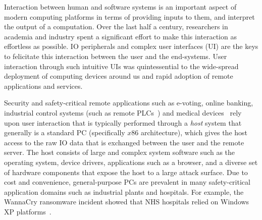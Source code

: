 Interaction between human and software systems is an important aspect of modern computing platforms in terms of providing inputs to them, and interpret the output of a computation. Over the last half a century, researchers in academia and industry spent a significant effort to make this interaction as effortless as possible. IO peripherals and complex user interfaces (UI) are the keys to felicitate this interaction between the user and the end-systems. User interaction through such intuitive UIs was quintessential to the wide-spread deployment of computing devices around us and rapid adoption of remote applications and services. 

Security and safety-critical remote applications such as e-voting, online banking, industrial control systems (such as remote PLCs~\cite{controlbyweb}) and medical devices~\cite{medicalDevice} rely upon user interaction that is typically performed through a \emph{host} system that generally is a standard PC (specifically $x86$ architecture), which gives the host access to the raw IO data that is exchanged between the user and the remote server. The host consists of large and complex system software such as the operating system, device drivers, applications such as a browser, and a diverse set of hardware components that expose the host to a large attack surface. Due to cost and convenience, general-purpose PCs are prevalent in many safety-critical application domains such as industrial plants and hospitals. For example, the WannaCry ransomware incident showed that NHS hospitals relied on Windows XP platforms~\cite{berry_2017,field_wannacry_2018}. 


